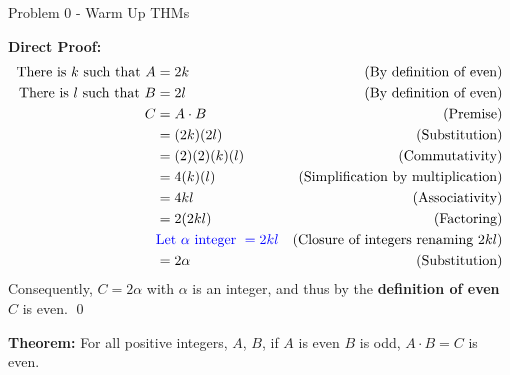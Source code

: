 \begin{problem}{Problem 0 - Warm Up THMs}
\begin{Highlight}
        \textbf{Direct Proof:} \newline
        \begin{align*}
            \text{There is $k$ such that } A & = 2k & \text{(By definition of even)} \\
            \text{There is $l$ such that } B & = 2l & \text{(By definition of even)} \\
            C & = A \cdot B & \text{(Premise)} \\
            & = (2k)(2l) & \text{(Substitution)} \\
            & = (2)(2)(k)(l) & \text{(Commutativity)} \\
            & = 4(k)(l) & \text{(Simplification by multiplication)} \\
            & = 4kl & \text{(Associativity)} \\
            & = 2(2kl) & \text{(Factoring)} \\
            & \textcolor{blue}{\text{Let } \alpha \text{ integer } = 2kl} & \text{(Closure of integers renaming $2kl$)} \\
            & = 2\alpha & \text{(Substitution)} \\
        \end{align*}
        Consequently, $C = 2\alpha$ with $\alpha$ is an integer, and thus by the \textbf{definition of even} $C$ is even. \qed
    \end{Highlight}

    \begin{Highlight}
        \textbf{Theorem:} For all positive integers, $A$, $B$, if $A$ is even $B$ is odd, $A \cdot B = C$ is even. \vspace*{1em}


\end{Highlight}
\end{problem}
